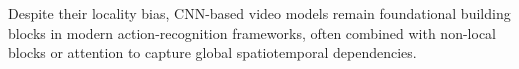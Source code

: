 Despite their locality bias, CNN-based video models remain foundational building blocks in modern action-recognition frameworks, often combined with non-local blocks or attention to capture global spatiotemporal dependencies.






